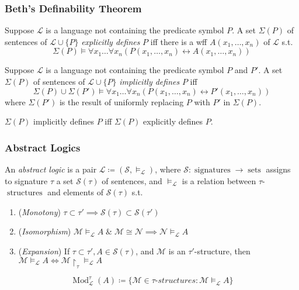 \documentclass[UTF8,aspectratio=43,11pt,colorlinks,compress,openany]{beamer}%
\begin{document}
\begin{frame}\frametitle{Beth's Definability Theorem}
\setlength\abovedisplayskip{0pt}
\setlength\belowdisplayskip{0pt}
	\begin{definition}
		Suppose $\mathscr{L}$ is a language not containing the predicate symbol $P$. A set $\Sigma(P)$ of sentences of $\mathscr{L}\cup\{P\}$ \emph{explicitly defines} $P$ iff there is a wff $A(x_1,\dots,x_n)$ of $\mathscr{L}$ s.t.
		\[\Sigma(P)\vDash\forall x_1\dots\forall x_n(P(x_1,\dots,x_n)\leftrightarrow A(x_1,\dots,x_n))\]
	\end{definition}
	\begin{definition}
		Suppose $\mathscr{L}$ is a language not containing the predicate symbol $P$ and $P'$. A set $\Sigma(P)$ of sentences of $\mathscr{L}\cup\{P\}$ \emph{implicitly defines} $P$ iff
		\[\Sigma(P)\cup\Sigma(P')\vDash\forall x_1\dots\forall x_n(P(x_1,\dots,x_n)\leftrightarrow P'(x_1,\dots,x_n))\]
		where $\Sigma(P')$ is the result of uniformly replacing $P$ with $P'$ in $\Sigma(P)$.
	\end{definition}
	\begin{theorem}
		$\Sigma(P)$ implicitly defines $P$ iff $\Sigma(P)$ explicitly defines $P$.
	\end{theorem}
	\centerline{}
\end{frame}

\begin{frame}\frametitle{Abstract Logics}
	\begin{definition}
		An \emph{abstract logic} is a pair $\mathcal{L}\coloneqq (\mathcal{S},\vDash_{\mathcal{L}})$, where $\mathcal{S}:\operatorname{signatures}\to\operatorname{sets}$ assigns to signature $\tau$ a set $\mathcal{S}(\tau)$ of sentences, and $\vDash_{\mathcal{L}}$ is a relation between $\tau$-$\operatorname{structures}$ and elements of
		$\mathcal{S}(\tau)$ s.t.
		\begin{enumerate}
			\item (\emph{Monotony}) $\tau\subset\tau'\implies \mathcal{S}(\tau) \subset \mathcal{S}(\tau')$
			\item (\emph{Isomorphism}) $\mathcal{M}\vDash_{\mathcal{L}} A\;\&\;\mathcal{M} \cong \mathcal{N}\implies\mathcal{N}\vDash_{\mathcal{L}}	 A$
			\item (\emph{Expansion}) If $\tau\subset\tau', A\in \mathcal{S}(\tau)$, and $\mathcal{M}$ is an $\tau'$-structure, then $\mathcal{M}\vDash_{\mathcal{L}} A\iff\mathcal{M}{\restriction_\tau}\vDash_{\mathcal{L}} A$
		\end{enumerate}
	\end{definition}
	\[\operatorname{Mod}_{\mathcal{L}}^\tau(A)\coloneqq \big\{\mathcal{M}\in\tau\text{-}structures:\mathcal{M}\vDash_{\mathcal{L}} A\big\}\]
\end{frame}
\end{document}
